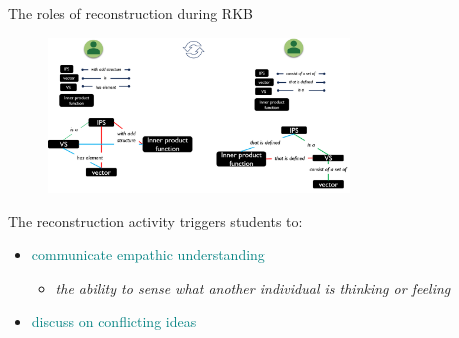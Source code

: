 \begin{frame}{The roles of reconstruction during RKB}
    \begin{figure}[tb]
        \begin{center}
            \includegraphics[width=80mm]{images/reconstruction_rkb.png}
        \end{center}
    \end{figure}
    
    The reconstruction activity triggers students to:
    \begin{itemize}
        \item <2->\textcolor{teal}{communicate empathic understanding}
        \begin{itemize}
            \item <3>\emph{the ability to sense what another individual is thinking or feeling \cite{barak1987increasing}}
        \end{itemize}
        \item <4->\textcolor{teal}{discuss on conflicting ideas}
        
    \end{itemize}
\end{frame}

